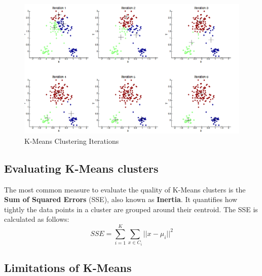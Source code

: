 \begin{figure}[htbp]
	\centering
	\includegraphics{images/04/kmeans.png}
	\caption{K-Means Clustering Iterations}
	\label{fig:kmeans}
\end{figure}

\subsection{Evaluating K-Means clusters}
The most common measure to evaluate the quality of K-Means clusters is the \textbf{Sum of Squared Errors} (SSE), also known as \textbf{Inertia}. It quantifies how tightly the data points in a cluster are grouped around their centroid. The SSE is calculated as follows:
\[
SSE = \sum_{i=1}^{K} \sum_{x \in C_i} ||x - \mu_i||^2
\]

\subsection{Limitations of K-Means}

